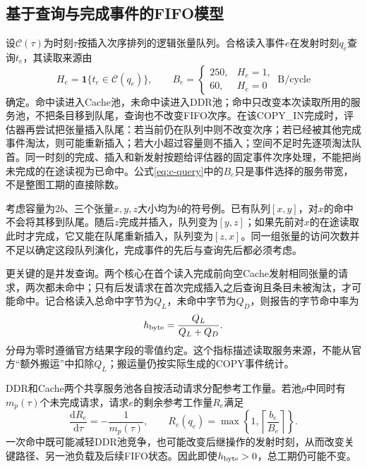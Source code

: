 \subsection{基于查询与完成事件的FIFO模型}
设$\mathcal C(\tau)$为时刻$\tau$按插入次序排列的逻辑张量队列。合格读入事件$e$在发射时刻$q_e$查询$t_e$，其读取来源由
\begin{equation}
H_e=\mathbf 1\{t_e\in\mathcal C(q_e)\},\qquad
B_e=\begin{cases}250,&H_e=1,\\60,&H_e=0\end{cases}\ \mathrm{B/cycle}
\label{eq:c-query}
\end{equation}
确定。命中读进入Cache池，未命中读进入DDR池；命中只改变本次读取所用的服务池，不把条目移到队尾，查询也不改变FIFO次序。在该COPY\_IN完成时，评估器再尝试把张量插入队尾：若当前仍在队列中则不改变次序；若已经被其他完成事件淘汰，则可能重新插入；若大小超过容量则不插入；空间不足时先逐项淘汰队首。同一时刻的完成、插入和新发射按题给评估器的固定事件次序处理，不能把尚未完成的在途读视为已命中。公式\eqref{eq:c-query}中的$B_e$只是事件选择的服务带宽，不是整图工期的直接除数。

考虑容量为$2b$、三个张量$x,y,z$大小均为$b$的符号例。已有队列$[x,y]$，对$x$的命中不会将其移到队尾。随后$z$完成并插入，队列变为$[y,z]$；如果先前对$x$的在途读取此时才完成，它又能在队尾重新插入，队列变为$[z,x]$。同一组张量的访问次数并不足以确定这段队列演化，完成事件的先后与查询先后都必须考虑。

更关键的是并发查询。两个核心在首个读入完成前向空Cache发射相同张量的请求，两次都未命中；只有后发请求在首次完成插入之后查询且条目未被淘汰，才可能命中。记合格读入总命中字节为$Q_L$，未命中字节为$Q_D$，则报告的字节命中率为
\begin{equation}
h_{\rm byte}=\frac{Q_L}{Q_L+Q_D}.
\label{eq:hit-rate}
\end{equation}
分母为零时遵循官方结果字段的零值约定。这个指标描述读取服务来源，不能从官方“额外搬运”中扣除$Q_L$；搬运量仍按实际生成的COPY事件统计。

DDR和Cache两个共享服务池各自按活动请求分配参考工作量。若池$p$中同时有$m_p(\tau)$个未完成请求，请求$e$的剩余参考工作量$R_e$满足
\begin{equation}
\frac{\mathrm dR_e}{\mathrm d\tau}=-\frac{1}{m_p(\tau)},\qquad
R_e(q_e)=\max\left\{1,\left\lceil\frac{b_e}{B_e}\right\rceil\right\}.
\label{eq:c-service}
\end{equation}
一次命中既可能减轻DDR池竞争，也可能改变后继操作的发射时刻，从而改变关键路径、另一池负载及后续FIFO状态。因此即使$h_{\rm byte}>0$，总工期仍可能不变。

